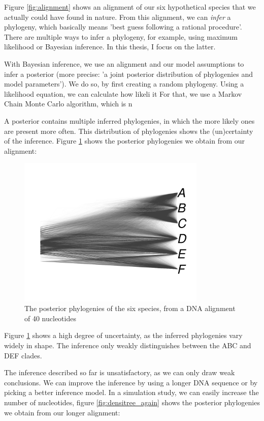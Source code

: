 Figure \ref{fig:alignment} shows an alignment of our six hypothetical species
that we actually could have found in nature. From this alignment, we
can \emph{infer} a phylogeny, which basically means 'best guess following a 
rational procedure'. There are multiple ways to infer a phylogeny, for
example, using maximum likelihood or Bayesian inference. In this thesis, 
I focus on the latter.

With Bayesian inference, we use an alignment and our model assumptions to infer 
a posterior (more 
precise: 'a joint posterior distribution of phylogenies and model parameters').
We do so, by first creating a random phylogeny. Using a likelihood equation,
we can calculate how likeli it  
For that, we use a Markov Chain Monte Carlo algorithm, which is n 


A posterior contains multiple inferred phylogenies, in which the more likely
ones are present more often. This distribution of phylogenies shows the
(un)certainty of the inference. Figure \ref{fig:densitree} shows the
posterior phylogenies we obtain from our alignment:

\begin{figure}[H]
  \includegraphics[width=0.8\textwidth]{densitree_40.png}
  \caption{
    The posterior phylogenies of the six species, 
    from a DNA alignment of 40 nucleotides
  }
  \label{fig:densitree}
\end{figure}

Figure \ref{fig:densitree} shows a high degree of uncertainty, as the
inferred phylogenies vary widely in shape. The inference only
weakly distinguishes between the ABC and DEF clades. 

The inference described so far is unsatisfactory, as we can only draw 
weak conclusions. We can improve the inference by using a longer DNA sequence 
or by picking a better inference model. In a simulation study, we can
easily increase the number of nucleotides, 
figure \ref{fig:densitree_again} shows the
posterior phylogenies we obtain from our longer alignment:

